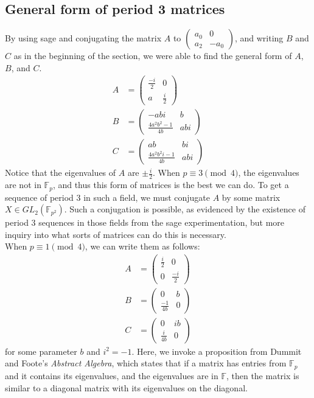 \documentclass[12pt, letterpaper]{article}
\theoremstyle{definition}
\newcommand{\F}{\mathbb{F}}
\begin{document}
\subsection{General form of period 3 matrices} By using sage and conjugating the matrix $A$ to $\begin{pmatrix} a_0 & 0 \\ a_2 & -a_0 \end{pmatrix}$, and writing $B$ and $C$ as in the beginning of the section, we were able to find the general form of $A$, $B$, and $C$.
\begin{align*}
A &= \begin{pmatrix}
\frac{-i}{2} & 0 \\
a & \frac{i}{2}
\end{pmatrix}\\
B &= \begin{pmatrix}
-abi & b\\
\frac{4a^2b^2-1}{4b} & abi
\end{pmatrix}\\
C&=\begin{pmatrix}
ab & bi\\
\frac{4a^2b^2i-1}{4b} & abi
\end{pmatrix}
\end{align*}
Notice that the eigenvalues of $A$ are $\pm\frac{i}{2}$. When $p\equiv 3\pmod 4$, the eigenvalues are not in $\F_p$, and thus this form of matrices is the best we can do. To get a sequence of period 3 in such a field, we must conjugate $A$ by some matrix $X \in GL_2(\mathbb{F}_{p^2})$. Such a conjugation is possible, as evidenced by the existence of period 3 sequences in those fields from the sage experimentation, but more inquiry into what sorts of matrices can do this is necessary.
\\When $p \equiv 1 \pmod 4$, we can write them as follows:
\begin{align*}
A &= \begin{pmatrix} \frac{i}{2} & 0 \\ 0 & \frac{-i}{2}\end{pmatrix} \\
B & = \begin{pmatrix} 0 & b \\ \frac{-1}{4b} & 0 \end{pmatrix} \\
C &= \begin{pmatrix} 0 & ib \\ \frac{i}{4b} & 0 \end{pmatrix}
\end{align*}
for some parameter $b$ and $i^2 = -1$. Here, we invoke a proposition from Dummit and Foote's \textit{Abstract Algebra}, which states that if a matrix has entries from $\F_p$ and it contains its eigenvalues, and the eigenvalues are in $\F$, then the matrix is similar to a diagonal matrix with its eigenvalues on the diagonal.
\end{document}
